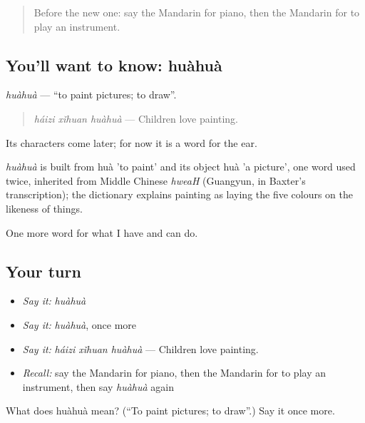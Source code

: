 \begin{quote}
Before the new one: say the Mandarin for piano, then the Mandarin for to play an instrument.
\end{quote}

\subsection*{You'll want to know: huàhuà}
\emph{huàhuà} — \textquotedblleft{}to paint pictures; to draw\textquotedblright{}.

\begin{quote}
\emph{háizi xǐhuan huàhuà} — Children love painting.
\end{quote}

Its characters come later; for now it is a word for the ear.

\begin{cousinweb}
\emph{huàhuà} is built from huà 'to paint' and its object huà 'a picture', one word used twice, inherited from Middle Chinese \emph{hweaH} (Guangyun, in Baxter's transcription); the dictionary explains painting as laying the five colours on the likeness of things.
\end{cousinweb}

\begin{grammarlens}[title={What you've built}]
One more word for what I have and can do.
\end{grammarlens}

\subsection*{Your turn}
\begin{itemize}
\raggedright
  \item \emph{Say it:} \emph{huàhuà}
  \item \emph{Say it:} \emph{huàhuà}, once more
  \item \emph{Say it:} \emph{háizi xǐhuan huàhuà} — Children love painting.
  \item \emph{Recall:} say the Mandarin for piano, then the Mandarin for to play an instrument, then say \emph{huàhuà} again
\end{itemize}

\begin{tcolorbox}[breakable,colback=teal!4,colframe=teal!35!black,title={Before you move on}]
What does huàhuà mean? (\textquotedblleft{}To paint pictures; to draw\textquotedblright{}.) Say it once more.
\end{tcolorbox}
